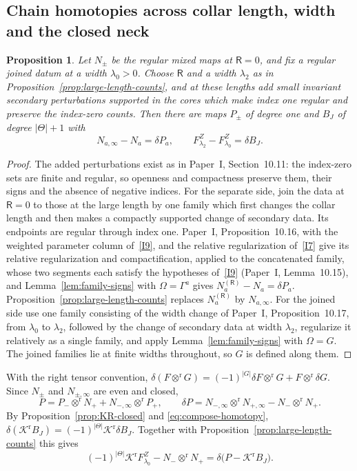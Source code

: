 \documentclass[11pt]{amsart}
\newtheorem{proposition}[theorem]{Proposition}
\theoremstyle{definition}
\theoremstyle{remark}
\theoremstyle{plain}
\numberwithin{equation}{section}
\begin{document}
\subsection{Chain homotopies across collar length, width and the closed neck}
\label{subsec:torus-finite}
\begin{proposition}\label{prop:finite-families}
Let $N_\pm$ be the regular mixed maps at $\mathsf R=0$, and fix a
regular joined datum at a width $\lambda_0>0$. Choose $\mathsf R$ and a width
$\lambda_2$ as in Proposition~\ref{prop:large-length-counts}, and at these
lengths add small invariant secondary perturbations supported in the
cores which make index one regular and preserve the index-zero
counts. Then there are maps $P_\pm$ of degree one and $B_J$ of degree
$|\Theta|+1$ with
\[
 N_{a,\infty}-N_a=\delta P_a,\qquad
 F^Z_{\lambda_2}-F^Z_{\lambda_0}=\delta B_J .
\]
\end{proposition}
\begin{proof}
The added perturbations exist as in Paper~I, Section~10.11: the
index-zero sets are finite and regular, so openness and compactness
preserve them, their signs and the absence of negative indices. For the
separate side, join the data at $\mathsf R=0$ to those at the large
length by one family which first changes the collar length and then
makes a compactly supported change of secondary data. Its endpoints are
regular through index one. Paper~I, Proposition~10.16, with the weighted
parameter column of~\ref{I9}, and the relative regularization of~\ref{I7}
give its relative regularization and compactification, applied to the
concatenated family, whose two segments each satisfy the hypotheses
of~\ref{I9} (Paper~I, Lemma~10.15), and Lemma~\ref{lem:family-signs} with
$\Omega=\Gamma^a$ gives $N^{(\mathsf R)}_a-N_a=\delta P_a$. Proposition~\ref{prop:large-length-counts}
replaces $N^{(\mathsf R)}_a$ by $N_{a,\infty}$. For the joined side use
one family consisting of the width change of Paper~I,
Proposition~10.17, from $\lambda_0$ to $\lambda_2$, followed by the change
of secondary data at width $\lambda_2$, regularize it relatively as a
single family, and apply Lemma~\ref{lem:family-signs} with
$\Omega=G$. The joined families lie
at finite widths throughout, so $G$ is defined along them.
\end{proof}

With the right tensor convention,
$\delta(F\otimes^{\mathrm r}G)=(-1)^{|G|}\delta F\otimes^{\mathrm r}G+F\otimes^{\mathrm r}\delta G$.
Since $N_\pm$ and $N_{\pm,\infty}$ are even and closed,
\begin{equation}\label{eq:P-homotopy}
 P=P_-\otimes^{\mathrm r}N_++N_{-,\infty}\otimes^{\mathrm r}P_+,\qquad
 \delta P=N_{-,\infty}\otimes^{\mathrm r}N_{+,\infty}-N_-\otimes^{\mathrm r}N_+ .
\end{equation}
By Proposition~\ref{prop:KR-closed} and \eqref{eq:compose-homotopy},
$\delta(\mathcal K^{\mathrm r}B_J)=(-1)^{|\Theta|}\mathcal K^{\mathrm r}\delta B_J$. Together with
Proposition~\ref{prop:large-length-counts} this gives
\begin{equation}\label{eq:width-homotopy}
 (-1)^{|\Theta|}\mathcal K^{\mathrm r}F^Z_{\lambda_0}-N_-\otimes^{\mathrm r}N_+
 =\delta\bigl(P-\mathcal K^{\mathrm r}B_J\bigr).
\end{equation}
\end{document}

